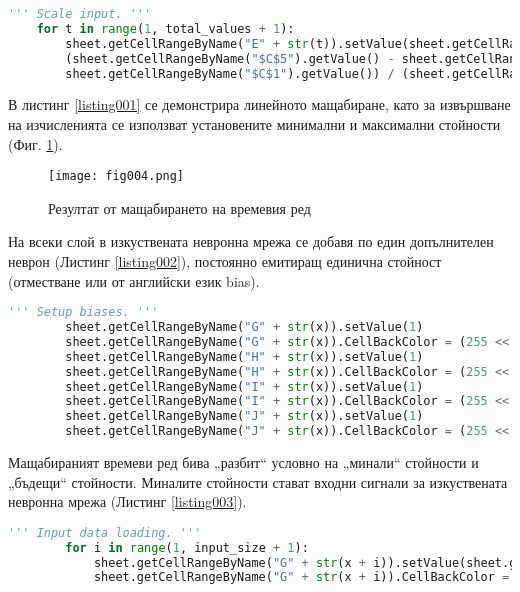 \begin{lstlisting}[caption=Мащабиране на оригиналния времеви ред, language=Python, basicstyle=\tiny, label=listing001]
    ''' Scale input. '''
    for t in range(1, total_values + 1):
        sheet.getCellRangeByName("E" + str(t)).setValue(sheet.getCellRangeByName("$C$4").getValue() + 
        (sheet.getCellRangeByName("$C$5").getValue() - sheet.getCellRangeByName("$C$4").getValue()) * ((sheet.getCellRangeByName("A" + str(t)).getValue() - 
        sheet.getCellRangeByName("$C$1").getValue()) / (sheet.getCellRangeByName("$C$2").getValue() - sheet.getCellRangeByName("$C$1").getValue())))
\end{lstlisting}

В листинг \ref{listing001} се демонстрира линейното мащабиране, като за извършване на изчисленията се използват установените минимални и максимални стойности (Фиг. \ref{fig004}). 

\begin{figure}[h]
  \centering
  \texttt{[image: fig004.png]}
  \caption{Резултат от мащабирането на времевия ред}
\label{fig004}
\end{figure}

На всеки слой в изкуствената невронна мрежа се добавя по един допълнителен неврон (Листинг \ref{listing002}), постоянно емитиращ единична стойност (отместване или от английски език bias).

\begin{lstlisting}[caption=Неврони емитиращи постоянно единичен сигнал, language=Python, basicstyle=\tiny, label=listing002]
        ''' Setup biases. '''
        sheet.getCellRangeByName("G" + str(x)).setValue(1)
        sheet.getCellRangeByName("G" + str(x)).CellBackColor = (255 << 16 | 255 << 8 | 0)
        sheet.getCellRangeByName("H" + str(x)).setValue(1)
        sheet.getCellRangeByName("H" + str(x)).CellBackColor = (255 << 16 | 255 << 8 | 0)
        sheet.getCellRangeByName("I" + str(x)).setValue(1)
        sheet.getCellRangeByName("I" + str(x)).CellBackColor = (255 << 16 | 255 << 8 | 0)
        sheet.getCellRangeByName("J" + str(x)).setValue(1)
        sheet.getCellRangeByName("J" + str(x)).CellBackColor = (255 << 16 | 255 << 8 | 0)
\end{lstlisting}

Мащабираният времеви ред бива „разбит“ условно на „минали“ стойности и „бъдещи“ стойности. Миналите стойности стават входни сигнали за изкуствената невронна мрежа (Листинг \ref{listing003}).

\begin{lstlisting}[caption=Формиране на входния слой, language=Python, basicstyle=\tiny, label=listing003]
        ''' Input data loading. '''
        for i in range(1, input_size + 1):
            sheet.getCellRangeByName("G" + str(x + i)).setValue(sheet.getCellRangeByName("E" + str(t + i)).getValue())
            sheet.getCellRangeByName("G" + str(x + i)).CellBackColor = (255 << 16 | 0 << 8 | 0)
\end{lstlisting}

